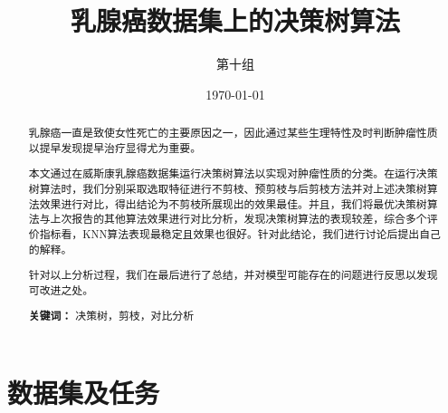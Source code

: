 \documentclass[a4paper,12pt,onecolumn,oneside]{article}
\title{乳腺癌数据集上的决策树算法}
\author{第十组}
\date{\today}
\begin{document}
	\maketitle
\begin{abstract}
	乳腺癌一直是致使女性死亡的主要原因之一，因此通过某些生理特性及时判断肿瘤性质以提早发现提早治疗显得尤为重要。
	
	本文通过在威斯康乳腺癌数据集运行决策树算法以实现对肿瘤性质的分类。在运行决策树算法时，我们分别采取选取特征进行不剪枝、预剪枝与后剪枝方法并对上述决策树算法效果进行对比，得出结论为不剪枝所展现出的效果最佳。并且，我们将最优决策树算法与上次报告的其他算法效果进行对比分析，发现决策树算法的表现较差，综合多个评价指标看，KNN算法表现最稳定且效果也很好。针对此结论，我们进行讨论后提出自己的解释。
	
	针对以上分析过程，我们在最后进行了总结，并对模型可能存在的问题进行反思以发现可改进之处。
	
	\textbf{关键词：} 决策树，剪枝，对比分析
	
\end{abstract}
\newpage
\begin{spacing}{1.2}
\tableofcontents
\end{spacing}
\newpage
\section{数据集及任务}
\end{document}
